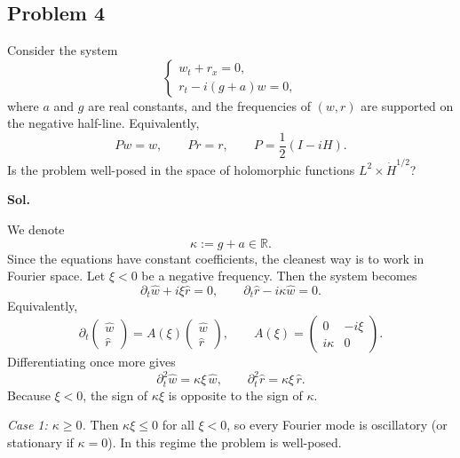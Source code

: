 \documentclass[lang=en,11pt,a4paper,citestyle=authoryear]{elegantpaper}
\newcommand{\R}{\mathbb{R}}
\newcommand{\1}{\mathbbm{1}}
\begin{document}
\vspace{0.5em}

\subsection*{Problem 4}
Consider the system
\[
\begin{cases}
 w_t+r_x=0,\\
 r_t-i(g+a)w=0,
\end{cases}
\]
where $a$ and $g$ are real constants, and the frequencies of $(w,r)$ are supported on the negative half-line. Equivalently,
\[
Pw=w,\qquad Pr=r,
\qquad P=\frac12(I-iH).
\]
Is the problem well-posed in the space of holomorphic functions $L^2\times \dot H^{1/2}$?

\vspace{0.5em}
\textbf{Sol.} \par
We denote
\[
\kappa:=g+a\in\R.
\]
Since the equations have constant coefficients, the cleanest way is to work in Fourier space. Let $\xi<0$ be a negative frequency. Then the system becomes
\[
\partial_t \widehat w + i\xi\widehat r=0,
\qquad
\partial_t \widehat r - i\kappa\widehat w=0.
\]
Equivalently,
\[
\partial_t
\begin{pmatrix}
\widehat w\\
\widehat r
\end{pmatrix}
=
A(\xi)
\begin{pmatrix}
\widehat w\\
\widehat r
\end{pmatrix},
\qquad
A(\xi)=
\begin{pmatrix}
0 & -i\xi\\
i\kappa & 0
\end{pmatrix}.
\]
Differentiating once more gives
\[
\partial_t^2\widehat w=\kappa\xi\,\widehat w,
\qquad
\partial_t^2\widehat r=\kappa\xi\,\widehat r.
\]
Because $\xi<0$, the sign of $\kappa\xi$ is opposite to the sign of $\kappa$.

\medskip
\emph{Case 1: $\kappa\ge 0$.} Then $\kappa\xi\le 0$ for all $\xi<0$, so every Fourier mode is oscillatory (or stationary if $\kappa=0$). In this regime the problem is well-posed.
\end{document}
